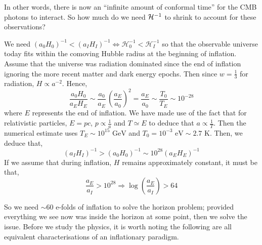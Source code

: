 In other words, there is now an ``infinite amount of conformal time'' for the CMB photons to interact. So how much do we need $\mathcal{H}^{-1}$ to shrink to account for these observations?
\begin{examplebox}
We need $(a_0H_0)^{-1} < (a_I H_I)^{-1} \iff \mathcal{H}^{-1}_0<\mathcal{H}^{-1}_I$ so that the observable universe today fits within the comoving Hubble radius at the beginning of inflation. Assume that the universe was radiation dominated since the end of inflation ignoring the more recent matter and dark energy epochs. Then since $w = \frac{1}{3}$ for radiation, $H \propto a^{-2}$. Hence,
\begin{equation}
\frac{a_0 H_0}{a_E H_E} \sim \frac{a_0}{a_E} \, \left(\frac{a_E}{a_0}\right)^2 = \frac{a_E}{a_0} \sim \frac{T_0}{T_E} \sim 10^{-28}
\end{equation}
where $E$ represents the end of inflation. We have made use of the fact that for relativistic particles, $E = pc$, $p \propto \frac{1}{a}$ and $T \simeq E$ to deduce that $a \propto \frac{1}{T}$. Then the numerical estimate uses $T_E \sim 10^{15} \textrm{ GeV}$ and $T_0 = 10^{-3} \textrm{ eV} \sim 2.7 \textrm{ K}$. Then, we deduce that,
$$(a_IH_I)^{-1} > (a_0H_0)^{-1} \sim 10^{28}(a_EH_E)^{-1}$$
If we assume that during inflation, $H$ remains approximately constant, it must be that,
\begin{equation}
\frac{a_E}{a_I}>10^{28} \Rightarrow \log\left(\frac{a_E}{a_I}\right) > 64
\end{equation}
\end{examplebox}
So we need $\sim 60$ e-folds of inflation to solve the horizon problem; provided everything we see now was inside the horizon at some point, then we solve the issue. Before we study the physics, it is worth noting the following are all equivalent characterisations of an inflationary paradigm.
